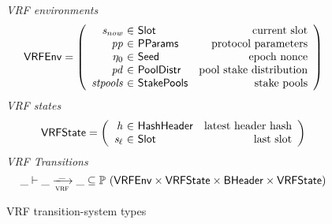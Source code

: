 \begin{figure}
  \emph{VRF environments}
  \begin{equation*}
    \VRFEnv =
    \left(
      \begin{array}{r@{~\in~}lr}
        \var{s_{now}} & \Slot & \text{current slot} \\
        \var{pp} & \PParams & \text{protocol parameters} \\
        \eta_0 & \Seed & \text{epoch nonce} \\
        \var{pd} & \PoolDistr & \text{pool stake distribution} \\
        \var{stpools} & \StakePools & \text{stake pools} \\
      \end{array}
    \right)
  \end{equation*}
  \emph{VRF states}
  \begin{equation*}
    \VRFState =
    \left(
      \begin{array}{r@{~\in~}lr}
        \var{h} & \HashHeader & \text{latest header hash} \\
        \var{s_\ell} & \Slot & \text{last slot} \\
      \end{array}
    \right)
  \end{equation*}
  \emph{VRF Transitions}
  \begin{equation*}
    \_ \vdash \var{\_} \trans{vrf}{\_} \var{\_} \subseteq
    \powerset (\VRFEnv \times \VRFState \times \BHeader \times \VRFState)
  \end{equation*}
  \caption{VRF transition-system types}
  \label{fig:ts-types:vrf}
\end{figure}

